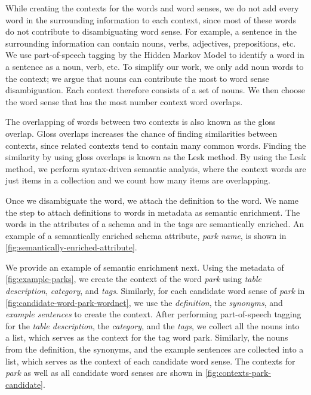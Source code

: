 While creating the contexts for the words and word senses, we do not add every word in the surrounding information to each context, since most of these words do not contribute to disambiguating word sense. For example, a sentence in the surrounding information can contain nouns, verbs, adjectives, prepositions, etc. We use part-of-speech tagging by the Hidden Markov Model to identify a word in a sentence as a noun, verb, etc. To simplify our work, we only add noun words to the context; we argue that nouns can contribute the most to word sense disambiguation. Each context therefore consists of a set of nouns. We then choose the word sense that has the most number context word overlaps.

The overlapping of words between two contexts is also known as the gloss overlap. Gloss overlaps increases the chance of finding similarities between contexts, since related contexts tend to contain many common words. Finding the similarity by using gloss overlaps is known as the Lesk method. By using the Lesk method, we perform syntax-driven semantic analysis, where the context words are just items in a collection and we count how many items are overlapping.

Once we disambiguate the word, we attach the definition to the word. We name the step to attach definitions to words in metadata as semantic enrichment. The words in the attributes of a schema and in the tags are semantically enriched. An example of a semantically enriched schema attribute, \textit{park name}, is shown in \autoref{fig:semantically-enriched-attribute}.

We provide an example of semantic enrichment next. Using the metadata of \autoref{fig:example-parks}, we create the context of the word \textit{park} using \textit{table description}, \textit{category}, and \textit{tags}. Similarly, for each candidate word sense of \textit{park} in \autoref{fig:candidate-word-park-wordnet}, we use the \textit{definition}, the \textit{synonyms}, and \textit{example sentences} to create the context. After performing part-of-speech tagging for the \textit{table description}, the \textit{category}, and the \textit{tags}, we collect all the nouns into a list, which serves as the context for the tag word park. Similarly, the nouns from the definition, the synonyms, and the example sentences are collected into a list, which serves as the context of each candidate word sense. The contexts for \textit{park} as well as all candidate word senses are shown in \autoref{fig:contexts-park-candidate}.


